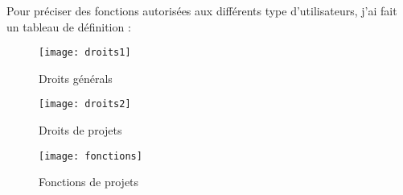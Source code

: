 Pour préciser des fonctions autorisées aux différents type d’utilisateurs, j’ai fait un tableau de définition :
\begin{figure}[H]
\centering
\texttt{[image: droits1]}
\caption{Droits générals}
\texttt{[image: droits2]}
\caption{Droits de projets}
\end{figure}
\begin{figure}[H]
\centering
\texttt{[image: fonctions]}
\caption{Fonctions de projets}
\end{figure}